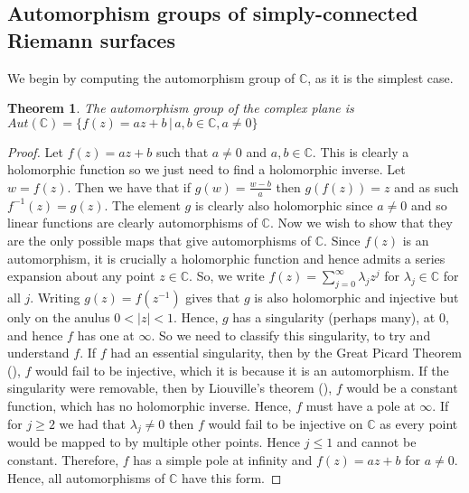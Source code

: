 \documentclass[11pt]{report}
\newtheorem{thm}{Theorem}[section]
\theoremstyle{definition}
\begin{document}
\subsection{Automorphism groups of simply-connected Riemann surfaces}
We begin by computing the automorphism group of $\mathbb{C}$, as it is the simplest case.
\begin{thm}\label{Aut(C)} 
  The automorphism group of the complex plane is ~\\$Aut(\mathbb{C})=\{f(z)=az+b \, \vert \, a, b \in  \mathbb{C}, a \neq 0\}$
\end{thm}
\begin{proof}
  Let $f(z) = az+b$ such that $a\neq 0$ and $a,b \in \mathbb{C}$. This is clearly a holomorphic function so we just need to find a holomorphic inverse. Let $w = f(z)$. Then we have that if $g(w) = \frac{w - b}{a}$ then $g(f(z))=z$ and as such $f^{-1}(z)=g(z)$. The element $g$ is clearly also holomorphic since $a \neq 0$ and so linear functions are clearly automorphisms of $\mathbb{C}$. Now we wish to show that they are the only possible maps that give automorphisms of $\mathbb{C}$. \newline
  Since $f(z)$ is an automorphism, it is crucially a holomorphic function and hence admits a series expansion about any point $z \in \mathbb{C}$. So, we write $f(z) = \sum\limits_{j=0}^{\infty}\lambda_jz^j$ for $\lambda_j \in \mathbb{C}$ for all $j$. Writing $g(z)=f(z^{-1})$ gives that $g$ is also holomorphic and injective but only on the anulus $0 < |z| < 1$. Hence, $g$ has a singularity (perhaps many), at $0$, and hence $f$ has one at $\infty$. So we need to classify this singularity, to try and understand $f$. If $f$ had an essential singularity, then by the Great Picard Theorem (\cite[p.300]{conway}), $f$ would fail to be injective, which it is because it is an automorphism. If the singularity were removable, then by Liouville's theorem (\cite[p.122]{ahlfors}), $f$ would be a constant function, which has no holomorphic inverse. Hence, $f$ must have a pole at $\infty$. If for $j\geq 2$ we had that $\lambda_j \neq 0$ then $f$ would fail to be injective on $\mathbb{C}$ as every point would be mapped to by multiple other points. Hence $j \leq 1$ and cannot be constant. Therefore, $f$ has a simple pole at infinity and $f(z) = az + b$ for $a \neq 0$. Hence, all automorphisms of $\mathbb{C}$ have this form.
\end{proof}
\end{document}

